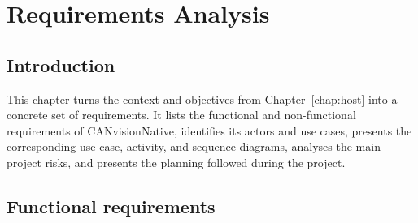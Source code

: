 \chapter{Requirements Analysis}
\label{chap:requirements}

\section{Introduction}

This chapter turns the context and objectives from Chapter~\ref{chap:host} into a concrete set of requirements. It lists the functional and non-functional requirements of CANvisionNative, identifies its actors and use cases, presents the corresponding use-case, activity, and sequence diagrams, analyses the main project risks, and presents the planning followed during the project.

\section{Functional requirements}

